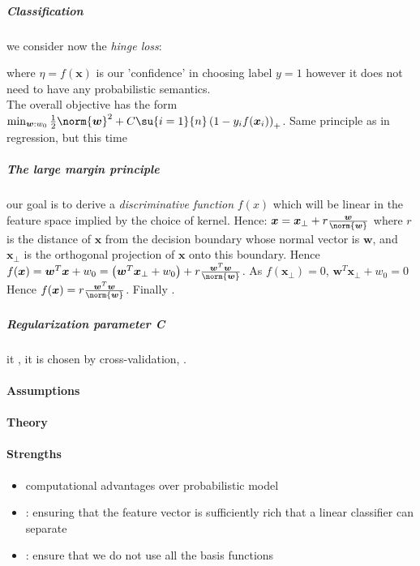 \subparagraph{Classification}
we consider now the \emph{hinge loss}:
\begin{center}
\end{center}
where $\eta=f(\bm{x})$ is our 'confidence' in choosing label $y=1$ however it does not
need to have any probabilistic semantics.\\
The overall objective has the form $\min_{\bm{w}:w_{0}}\frac{1}{2}\norm{\bm{w}}^{2} +
C\su{i=1}{n}\left(1-y_{i}f(\bm{x}_{i})\right)_{+}$. Same principle as in regression, but
this time 
\subparagraph{The large margin principle}
our goal is to derive a \emph{discriminative function} $f(x)$ which will be linear in the feature
space implied by the choice of kernel. Hence: $\bm{x} = \bm{x}_{\perp} + 
r\frac{\bm{w}}{\norm{\bm{w}}}$ where $r$ is the distance of $\bm{x}$ from the decision boundary 
whose normal vector is $\bm{w}$, and $\bm{x}_{\perp}$ is the orthogonal projection of $\bm{x}$
onto this boundary. Hence $f(\bm{x}) = \bm{w}^{T}\bm{x} +w_{0} = \left(\bm{w}^{T}\bm{x}_{\perp}
+ w_{0}\right) + r\frac{\bm{w}^{T}\bm{w}}{\norm{\bm{w}}}$. As $f(\bm{x}_{\perp}) = 0$,
$\bm{w}^{T}\bm{x}_{\perp} +w_{0} = 0$ Hence $f(\bm{x}) = r\frac{\bm{w}^{T}\bm{w}}{\norm{\bm{w}}}$.
Finally .
\subparagraph{Regularization parameter \emph{C}}
it , it is chosen by
cross-validation, .

\paragraph{Assumptions}
\paragraph{Theory}
\paragraph{Strengths}
\begin{itemize}
    \item computational advantages over probabilistic model
    \item {}: ensuring that the feature 
        vector is sufficiently rich that a linear classifier can separate
    \item {}: 
        ensure that we do not use all the basis functions

\end{itemize}

